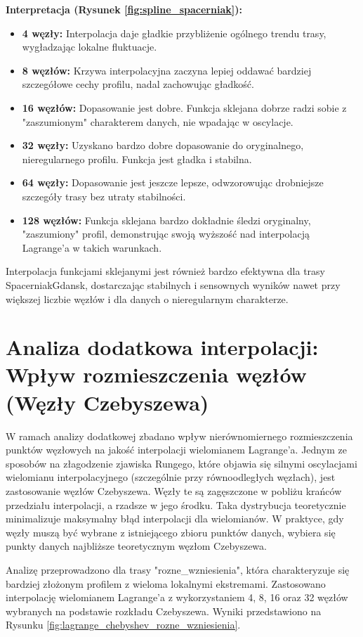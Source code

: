 \documentclass[11pt,a4paper]{article}
\begin{document}
\textbf{Interpretacja (Rysunek \ref{fig:spline_spacerniak}):} 
\begin{itemize}
    \item \textbf{4 węzły:} Interpolacja daje gładkie przybliżenie ogólnego trendu trasy, wygładzając lokalne fluktuacje.
    \item \textbf{8 węzłów:} Krzywa interpolacyjna zaczyna lepiej oddawać bardziej szczegółowe cechy profilu, nadal zachowując gładkość.
    \item \textbf{16 węzłów:} Dopasowanie jest dobre. Funkcja sklejana dobrze radzi sobie z "zaszumionym" charakterem danych, nie wpadając w oscylacje.
    \item \textbf{32 węzły:} Uzyskano bardzo dobre dopasowanie do oryginalnego, nieregularnego profilu. Funkcja jest gładka i stabilna.
    \item \textbf{64 węzły:} Dopasowanie jest jeszcze lepsze, odwzorowując drobniejsze szczegóły trasy bez utraty stabilności.
    \item \textbf{128 węzłów:} Funkcja sklejana bardzo dokładnie śledzi oryginalny, "zaszumiony" profil, demonstrując swoją wyższość nad interpolacją Lagrange'a w takich warunkach.
\end{itemize}
Interpolacja funkcjami sklejanymi jest również bardzo efektywna dla trasy SpacerniakGdansk, dostarczając stabilnych i sensownych wyników nawet przy większej liczbie węzłów i dla danych o nieregularnym charakterze.

\section{Analiza dodatkowa interpolacji: Wpływ rozmieszczenia węzłów (Węzły Czebyszewa)}
\label{sec:analiza_dodatkowa}
W ramach analizy dodatkowej zbadano wpływ nierównomiernego rozmieszczenia punktów węzłowych na jakość interpolacji wielomianem Lagrange'a. Jednym ze sposobów na złagodzenie zjawiska Rungego, które objawia się silnymi oscylacjami wielomianu interpolacyjnego (szczególnie przy równoodległych węzłach), jest zastosowanie węzłów Czebyszewa. Węzły te są zagęszczone w pobliżu krańców przedziału interpolacji, a rzadsze w jego środku. Taka dystrybucja teoretycznie minimalizuje maksymalny błąd interpolacji dla wielomianów. W praktyce, gdy węzły muszą być wybrane z istniejącego zbioru punktów danych, wybiera się punkty danych najbliższe teoretycznym węzłom Czebyszewa.

Analizę przeprowadzono dla trasy "rozne\_wzniesienia", która charakteryzuje się bardziej złożonym profilem z wieloma lokalnymi ekstremami. Zastosowano interpolację wielomianem Lagrange'a z wykorzystaniem 4, 8, 16 oraz 32 węzłów wybranych na podstawie rozkładu Czebyszewa. Wyniki przedstawiono na Rysunku \ref{fig:lagrange_chebyshev_rozne_wzniesienia}.
\end{document}
